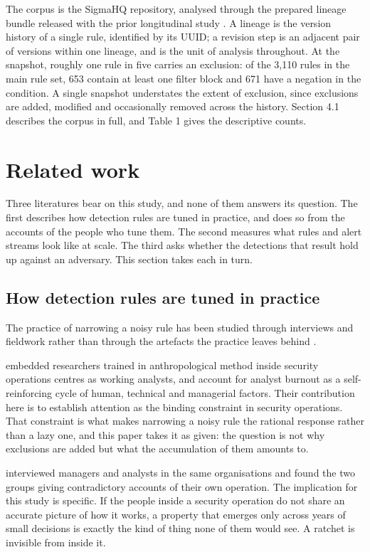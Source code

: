 The corpus is the SigmaHQ repository, analysed through the prepared lineage bundle released with the prior longitudinal study \citep{long2026}. A lineage is the version history of a single rule, identified by its UUID; a revision step is an adjacent pair of versions within one lineage, and is the unit of analysis throughout. At the snapshot, roughly one rule in five carries an exclusion: of the 3,110 rules in the main rule set, 653 contain at least one filter block and 671 have a negation in the condition. A single snapshot understates the extent of exclusion, since exclusions are added, modified and occasionally removed across the history. Section 4.1 describes the corpus in full, and Table 1 gives the descriptive counts.

\section{Related work}
\label{sec:related}

Three literatures bear on this study, and none of them answers its question. The first describes how detection rules are tuned in practice, and does so from the accounts of the people who tune them. The second measures what rules and alert streams look like at scale. The third asks whether the detections that result hold up against an adversary. This section takes each in turn.

\subsection{How detection rules are tuned in practice}

The practice of narrowing a noisy rule has been studied through interviews and fieldwork rather than through the artefacts the practice leaves behind \citep{sundaramurthy2015,kokulu2019,alahmadi2022,vermeer2023,teuwen2025}.

\citet{sundaramurthy2015} embedded researchers trained in anthropological method inside security operations centres as working analysts, and account for analyst burnout as a self-reinforcing cycle of human, technical and managerial factors. Their contribution here is to establish attention as the binding constraint in security operations. That constraint is what makes narrowing a noisy rule the rational response rather than a lazy one, and this paper takes it as given: the question is not why exclusions are added but what the accumulation of them amounts to.

\citet{kokulu2019} interviewed managers and analysts in the same organisations and found the two groups giving contradictory accounts of their own operation. The implication for this study is specific. If the people inside a security operation do not share an accurate picture of how it works, a property that emerges only across years of small decisions is exactly the kind of thing none of them would see. A ratchet is invisible from inside it.

